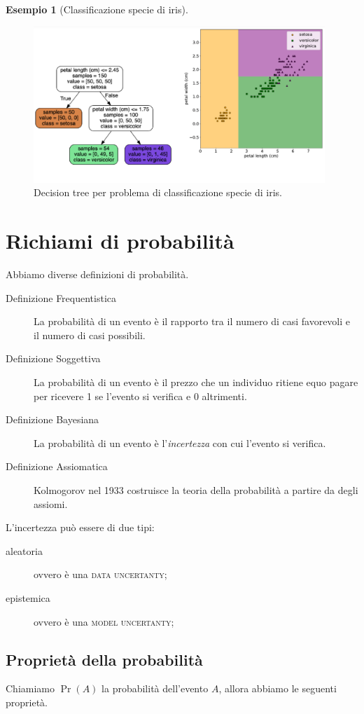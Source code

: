 \documentclass[10pt]{article}
\newcommand{\im}[1]{\textsc{#1}}
\theoremstyle{definition}
\newtheorem{example}{Esempio}[section]
\theoremstyle{definition}
\DeclareMathOperator{\pr}{Pr}
\begin{document}
\begin{example}[Classificazione specie di iris]
\begin{figure}
\includegraphics[width=0.98\textwidth]{Images/iris_decision_tree.PNG}
\caption{Decision tree per problema di classificazione specie di iris.}\label{fig:iris-decision-tree}
\end{figure}

\end{example}

\section{Richiami di probabilità}
Abbiamo diverse definizioni di probabilità.
\begin{description}
\item[Definizione Frequentistica] La probabilità di un evento è il rapporto tra il numero di casi favorevoli e il numero di casi possibili.
\item[Definizione Soggettiva] La probabilità di un evento è il prezzo che un individuo ritiene equo pagare per ricevere 1 se l'evento si verifica e 0 altrimenti.
\item[Definizione Bayesiana] La probabilità di un evento è l'\textit{incertezza} con cui l'evento si verifica.
\item[Definizione Assiomatica] Kolmogorov nel 1933 costruisce la teoria della probabilità a partire da degli assiomi.
\end{description}

L'incertezza può essere di due tipi:
\begin{description}
\item[aleatoria] ovvero è una \im{data uncertanty};
\item[epistemica] ovvero è una \im{model uncertanty};
\end{description}

\subsection{Proprietà della probabilità}
Chiamiamo $\pr(A)$ la probabilità dell'evento $A$, allora abbiamo le seguenti proprietà.
\end{document}
